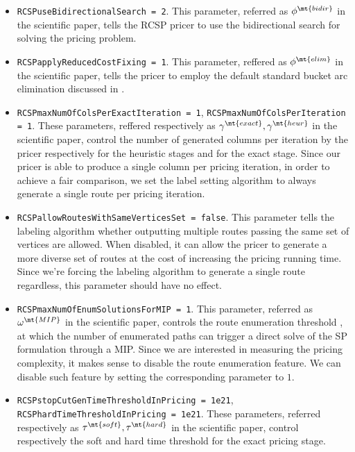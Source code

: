 \begin{itemize}
	\item \texttt{RCSPuseBidirectionalSearch = 2}.
	      This parameter, referred as $\phi^\mt{bidir}$ in the scientific paper,
	      tells the RCSP pricer to use the bidirectional search for solving the pricing problem.
	\item \texttt{RCSPapplyReducedCostFixing = 1}.
	      This parameter, reffered as $\phi^\mt{elim}$ in the scientific paper,
	      tells the pricer to employ the default standard bucket arc elimination discussed in \textcite{sadykov2021a}.
	\item \texttt{RCSPmaxNumOfColsPerExactIteration = 1}, \texttt{RCSPmaxNumOfColsPerIteration = 1}.
	      These parameters, reffered respectively as $\gamma^\mt{exact}, \gamma^\mt{heur}$ in the scientific paper,
	      control the number of generated columns per iteration by the pricer respectively
	      for the heuristic stages
	      and for the exact stage.
	      Since our pricer is able to produce a single column per pricing iteration, in order to achieve a fair comparison,
	      we set the label setting algorithm to always generate a single route per pricing iteration.
	\item \texttt{RCSPallowRoutesWithSameVerticesSet = false}.
	      This parameter tells the labeling algorithm whether outputting multiple routes passing the same set of vertices are allowed.
	      When disabled,
	      it can allow the pricer to generate a more diverse set of routes
	      at the cost of increasing the pricing running time.
	      Since we're forcing the labeling algorithm to generate a single route regardless, this parameter should have no effect.
	\item \texttt{RCSPmaxNumOfEnumSolutionsForMIP = 1}.
	      This parameter, referred as $\omega^\mt{MIP}$ in the scientific paper,
	      controls the route enumeration threshold \parencite{baldacci2008},
	      at which the number of enumerated paths can trigger a direct solve of the SP formulation through a MIP.
	      Since we are interested in measuring the pricing complexity, it makes sense to disable the route enumeration feature.
	      We can disable such feature by setting the corresponding parameter to $1$.
	\item \texttt{RCSPstopCutGenTimeThresholdInPricing = 1e21}, \texttt{RCSPhardTimeThresholdInPricing = 1e21}.
	      These parameters, referred respectively as $\tau^\mt{soft}, \tau^\mt{hard}$ in the scientific paper,
	      control respectively the soft and hard time threshold for the exact pricing stage.

\end{itemize}
